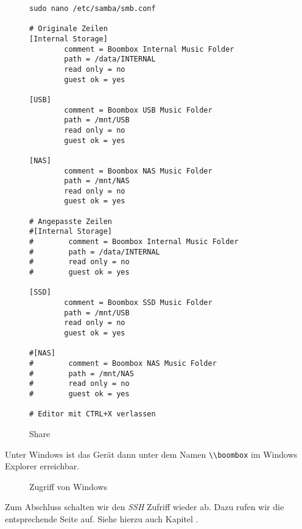 \documentclass[12pt,a4paper]{article}
\newcommand{\code}[1]{\texttt{#1}}
\newcommand{\jpaimg}[2]{\begin{figure}[H]\centering\fbox{\texttt{[image: \#1]}}\caption{#2}\label{fig:#2}\end{figure}}
\begin{document}
\begin{figure}[H]
\begin{lstlisting}
sudo nano /etc/samba/smb.conf

# Originale Zeilen
[Internal Storage]
        comment = Boombox Internal Music Folder
        path = /data/INTERNAL
        read only = no
        guest ok = yes

[USB]
        comment = Boombox USB Music Folder
        path = /mnt/USB
        read only = no
        guest ok = yes

[NAS]
        comment = Boombox NAS Music Folder
        path = /mnt/NAS
        read only = no
        guest ok = yes

# Angepasste Zeilen
#[Internal Storage]
#        comment = Boombox Internal Music Folder
#        path = /data/INTERNAL
#        read only = no
#        guest ok = yes

[SSD]
        comment = Boombox SSD Music Folder
        path = /mnt/USB
        read only = no
        guest ok = yes

#[NAS]
#        comment = Boombox NAS Music Folder
#        path = /mnt/NAS
#        read only = no
#        guest ok = yes

# Editor mit CTRL+X verlassen
\end{lstlisting}
\caption{Share}\label{fig:Share}
\end{figure}

\newpage
Unter Windows ist das Gerät dann unter dem Namen \code{\textbackslash{}\textbackslash{}boombox} im Windows Explorer erreichbar.

\jpaimg{./../images/win-bb.png}{Zugriff von Windows}

Zum Abschluss schalten wir den \textit{SSH} Zufriff wieder ab. Dazu rufen wir die entsprechende Seite auf. Siehe hierzu auch Kapitel .

\clearpage{}
\listoffigures\thispagestyle{fancy}
\newpage

\clearpage{}
\listoftables\thispagestyle{fancy}
\newpage

\renewcommand{\indexname}{Stichwortverzeichnis}
\clearpage{}
\printindex
\newpage
\end{document}
